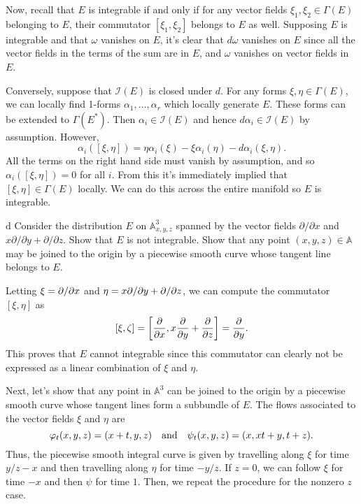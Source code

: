 \documentclass{../../templates/lkx_pset}
\begin{document}
\begin{parts}
	Now, recall that $E$ is integrable if and only if for any vector fields $\xi_1,\xi_2\in \Gamma(E)$ belonging to $E$, their commutator $[\xi_1, \xi_2]$ belongs to $E$ as well. Supposing $E$ is integrable and that $\omega$ vanishes on $E$, it's clear that $d\omega$ vanishes on $E$ since all the vector fields in the terms of the sum are in $E$, and $\omega$ vanishes on vector fields in $E$.


	Conversely, suppose that $\mathcal{I}(E)$ is closed under $d$. For any forms $\xi,\eta\in \Gamma(E)$, we can locally find 1-forms $\alpha_1,\ldots,\alpha_r$ which locally generate $E$. These forms can be extended to $\Gamma(E^*)$. Then $\alpha_i\in \mathcal{I}(E)$ and hence $d\alpha_i\in \mathcal{I}(E)$ by assumption. However,
	\[
		\alpha_i([\xi, \eta]) = \eta \alpha_i(\xi) - \xi\alpha_i(\eta) - d\alpha_i(\xi,\eta).
	\]
	All the terms on the right hand side must vanish by assumption, and so $\alpha_i([\xi,\eta])=0$ for all $i$. From this it's immediately implied that $[\xi,\eta]\in \Gamma(E)$ locally. We can do this across the entire manifold so $E$ is integrable.

	\begin{part}{d}
		Consider the distribution $E$ on $\mathbb{A}^3_{x,y,z}$ spanned by the vector fields $\partial/\partial x$ and $x\partial/\partial y + \partial/\partial z$. Show that $E$ is not integrable. Show that any point $(x,y,z)\in \mathbb{A}$ may be joined to the origin by a piecewise smooth curve whose tangent line belongs to $E$.
	\end{part}

	Letting $\xi=\partial/\partial x$ and $\eta = x\partial/\partial y + \partial/\partial z$, we can compute the commutator $[\xi, \eta]$ as
	\[
		[\xi,\zeta] = \left[\frac{\partial }{\partial x}, x\frac{\partial }{\partial y} + \frac{\partial }{\partial z}\right] = \frac{\partial }{\partial y}.
	\]
	This proves that $E$ cannot integrable since this commutator can clearly not be expressed as a linear combination of $\xi$ and $\eta$.

	Next, let's show that any point in $\mathbb{A}^3$ can be joined to the origin by a piecewise smooth curve whose tangent lines form a subbundle of $E$. The flows associated to the vector fields $\xi$ and $\eta$ are
	\[
		\varphi_t(x,y,z)= ( x+t, y, z)\quad\textrm{and}\quad\psi_t(x,y,z) = (x,xt+y, t+z).
	\]
	Thus, the piecewise smooth integral curve is given by travelling along $\xi$ for time $y/z-x$ and then travelling along $\eta$ for time $-y/z$. If $z=0$, we can follow $\xi$ for time $-x$ and then $\psi$ for time $1$. Then, we repeat the procedure for the nonzero $z$ case.
\end{parts}
\end{document}
